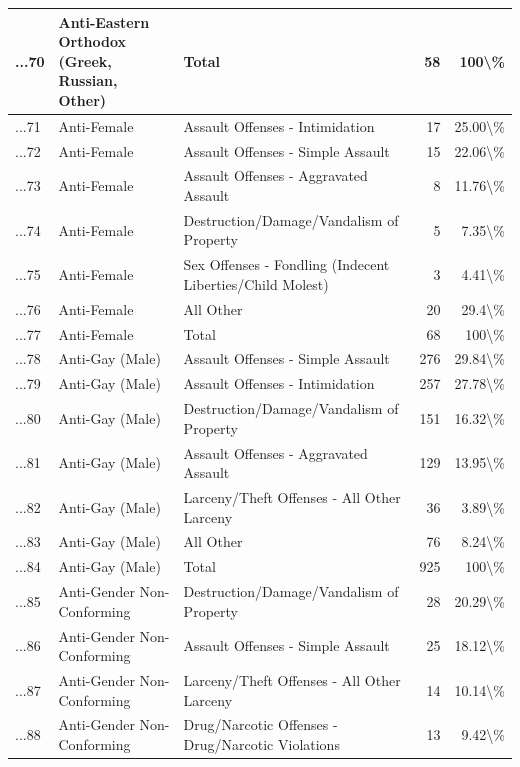 \documentclass[
]{krantz}
\begin{document}
\begin{longtable}[t]{l|l|l|r|r}
\hline
...70 & Anti-Eastern Orthodox (Greek, Russian, Other) & Total & 58 & 100\textbackslash{}\%\\
\hline
...71 & Anti-Female & Assault Offenses - Intimidation & 17 & 25.00\textbackslash{}\%\\
\hline
...72 & Anti-Female & Assault Offenses - Simple Assault & 15 & 22.06\textbackslash{}\%\\
\hline
...73 & Anti-Female & Assault Offenses - Aggravated Assault & 8 & 11.76\textbackslash{}\%\\
\hline
...74 & Anti-Female & Destruction/Damage/Vandalism of Property & 5 & 7.35\textbackslash{}\%\\
\hline
...75 & Anti-Female & Sex Offenses - Fondling (Indecent Liberties/Child Molest) & 3 & 4.41\textbackslash{}\%\\
\hline
...76 & Anti-Female & All Other & 20 & 29.4\textbackslash{}\%\\
\hline
...77 & Anti-Female & Total & 68 & 100\textbackslash{}\%\\
\hline
...78 & Anti-Gay (Male) & Assault Offenses - Simple Assault & 276 & 29.84\textbackslash{}\%\\
\hline
...79 & Anti-Gay (Male) & Assault Offenses - Intimidation & 257 & 27.78\textbackslash{}\%\\
\hline
...80 & Anti-Gay (Male) & Destruction/Damage/Vandalism of Property & 151 & 16.32\textbackslash{}\%\\
\hline
...81 & Anti-Gay (Male) & Assault Offenses - Aggravated Assault & 129 & 13.95\textbackslash{}\%\\
\hline
...82 & Anti-Gay (Male) & Larceny/Theft Offenses - All Other Larceny & 36 & 3.89\textbackslash{}\%\\
\hline
...83 & Anti-Gay (Male) & All Other & 76 & 8.24\textbackslash{}\%\\
\hline
...84 & Anti-Gay (Male) & Total & 925 & 100\textbackslash{}\%\\
\hline
...85 & Anti-Gender Non-Conforming & Destruction/Damage/Vandalism of Property & 28 & 20.29\textbackslash{}\%\\
\hline
...86 & Anti-Gender Non-Conforming & Assault Offenses - Simple Assault & 25 & 18.12\textbackslash{}\%\\
\hline
...87 & Anti-Gender Non-Conforming & Larceny/Theft Offenses - All Other Larceny & 14 & 10.14\textbackslash{}\%\\
\hline
...88 & Anti-Gender Non-Conforming & Drug/Narcotic Offenses - Drug/Narcotic Violations & 13 & 9.42\textbackslash{}\%\\

\end{longtable}
\end{document}
